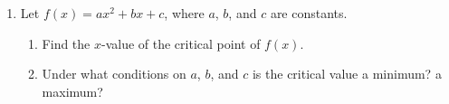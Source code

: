 \documentclass[11pt]{article}
\begin{document}
\begin{enumerate}
  \newpage

\item Let $f(x)=ax^2+bx+c$, where $a$, $b$, and $c$ are constants.

  \begin{enumerate}
  \item Find the $x$-value of the critical point of $f(x)$.

    \vfill

  \item Under what conditions on $a$, $b$, and $c$ is the critical
    value a minimum? a maximum?

    \vfill
  \end{enumerate}


\end{enumerate}
\end{document}
